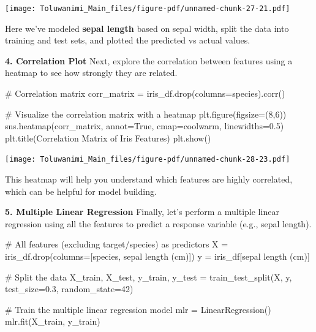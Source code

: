 \documentclass[
  letterpaper,
  DIV=11,
  numbers=noendperiod]{scrreprt}
\newenvironment{Shaded}{\begin{snugshade}}{\end{snugshade}}
\newcommand{\CommentTok}[1]{\textcolor[rgb]{0.37,0.37,0.37}{#1}}
\newcommand{\DecValTok}[1]{\textcolor[rgb]{0.68,0.00,0.00}{#1}}
\newcommand{\FloatTok}[1]{\textcolor[rgb]{0.68,0.00,0.00}{#1}}
\newcommand{\NormalTok}[1]{\textcolor[rgb]{0.00,0.23,0.31}{#1}}
\newcommand{\OperatorTok}[1]{\textcolor[rgb]{0.37,0.37,0.37}{#1}}
\newcommand{\StringTok}[1]{\textcolor[rgb]{0.13,0.47,0.30}{#1}}
\newcommand{\VariableTok}[1]{\textcolor[rgb]{0.07,0.07,0.07}{#1}}
\begin{document}
\texttt{[image: Toluwanimi\_Main\_files/figure-pdf/unnamed-chunk-27-21.pdf]}

Here we've modeled \textbf{sepal length} based on sepal width, split the
data into training and test sets, and plotted the predicted vs actual
values.

\textbf{4. Correlation Plot} Next, explore the correlation between
features using a heatmap to see how strongly they are related.

\begin{Shaded}
\begin{Highlighting}[]
\CommentTok{\# Correlation matrix}
\NormalTok{corr\_matrix }\OperatorTok{=}\NormalTok{ iris\_df.drop(columns}\OperatorTok{=}\StringTok{\textquotesingle{}species\textquotesingle{}}\NormalTok{).corr()}

\CommentTok{\# Visualize the correlation matrix with a heatmap}
\NormalTok{plt.figure(figsize}\OperatorTok{=}\NormalTok{(}\DecValTok{8}\NormalTok{,}\DecValTok{6}\NormalTok{))}
\NormalTok{sns.heatmap(corr\_matrix, annot}\OperatorTok{=}\VariableTok{True}\NormalTok{, cmap}\OperatorTok{=}\StringTok{\textquotesingle{}coolwarm\textquotesingle{}}\NormalTok{, linewidths}\OperatorTok{=}\FloatTok{0.5}\NormalTok{)}
\NormalTok{plt.title(}\StringTok{\textquotesingle{}Correlation Matrix of Iris Features\textquotesingle{}}\NormalTok{)}
\NormalTok{plt.show()}
\end{Highlighting}
\end{Shaded}

\texttt{[image: Toluwanimi\_Main\_files/figure-pdf/unnamed-chunk-28-23.pdf]}

This heatmap will help you understand which features are highly
correlated, which can be helpful for model building.

\textbf{5. Multiple Linear Regression} Finally, let's perform a multiple
linear regression using all the features to predict a response variable
(e.g., sepal length).

\begin{Shaded}
\begin{Highlighting}[]
\CommentTok{\# All features (excluding target/species) as predictors}
\NormalTok{X }\OperatorTok{=}\NormalTok{ iris\_df.drop(columns}\OperatorTok{=}\NormalTok{[}\StringTok{\textquotesingle{}species\textquotesingle{}}\NormalTok{, }\StringTok{\textquotesingle{}sepal length (cm)\textquotesingle{}}\NormalTok{])}
\NormalTok{y }\OperatorTok{=}\NormalTok{ iris\_df[}\StringTok{\textquotesingle{}sepal length (cm)\textquotesingle{}}\NormalTok{]}

\CommentTok{\# Split the data}
\NormalTok{X\_train, X\_test, y\_train, y\_test }\OperatorTok{=}\NormalTok{ train\_test\_split(X, y, test\_size}\OperatorTok{=}\FloatTok{0.3}\NormalTok{, random\_state}\OperatorTok{=}\DecValTok{42}\NormalTok{)}

\CommentTok{\# Train the multiple linear regression model}
\NormalTok{mlr }\OperatorTok{=}\NormalTok{ LinearRegression()}
\NormalTok{mlr.fit(X\_train, y\_train)}
\end{Highlighting}
\end{Shaded}
\end{document}

